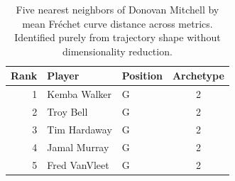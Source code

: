 \begin{table}[htbp]
  \centering\small
  \begin{tabular}{rllc}
    \toprule
    Rank & Player & Position & Archetype \\
    \midrule
    1 & Kemba Walker & G & 2 \\
    2 & Troy Bell & G & 2 \\
    3 & Tim Hardaway & G & 2 \\
    4 & Jamal Murray & G & 2 \\
    5 & Fred VanVleet & G & 2 \\
    \bottomrule
  \end{tabular}
  \caption{Five nearest neighbors of Donovan Mitchell by mean Fr\'{e}chet curve distance across metrics. Identified purely from trajectory shape without dimensionality reduction.}
  \label{tab:Donovan_Mitchell_frechet_curve_neighbors}
\end{table}

